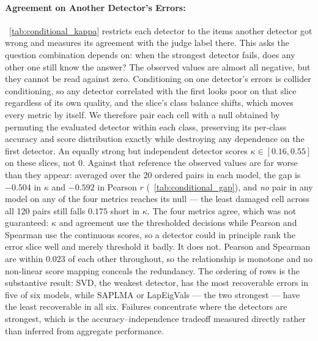 \paragraph{Agreement on Another Detector's Errors:}
\tablename~\ref{tab:conditional_kappa} restricts each detector to the items another
detector got wrong and measures its agreement with the judge label there. This asks the
question combination depends on: when the strongest detector fails, does any other one
still know the answer? The observed values are almost all negative, but they cannot be
read against zero. Conditioning on one detector's errors is collider conditioning, so any
detector correlated with the first looks poor on that slice regardless of its own quality,
and the slice's class balance shifts, which moves every metric by itself. We therefore
pair each cell with a null obtained by permuting the evaluated detector within each class,
preserving its per-class accuracy and score distribution exactly while destroying any
dependence on the first detector. An equally strong but independent detector scores
$\kappa \in [0.16, 0.55]$ on these slices, not $0$. Against that reference the observed
values are far worse than they appear: averaged over the 20 ordered pairs in each model,
the gap is $-0.504$ in $\kappa$ and $-0.592$ in Pearson $r$
(\tablename~\ref{tab:conditional_gap}), and \emph{no} pair in any model on any of the four
metrics reaches its null --- the least damaged cell across all 120 pairs still falls
$0.175$ short in $\kappa$. The four metrics agree, which was not guaranteed: $\kappa$ and
agreement use the thresholded decisions while Pearson and Spearman use the continuous
scores, so a detector could in principle rank the error slice well and merely threshold it
badly. It does not. Pearson and Spearman are within $0.023$ of each other throughout, so
the relationship is monotone and no non-linear score mapping conceals the redundancy. The
ordering of rows is the substantive result: SVD, the weakest detector, has the most
recoverable errors in five of six models, while SAPLMA or LapEigVals --- the two
strongest --- have the least recoverable in all six. Failures concentrate where the
detectors are strongest, which is the accuracy--independence tradeoff measured directly
rather than inferred from aggregate performance.

